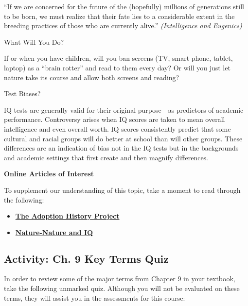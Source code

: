 \documentclass[
]{book}
\begin{document}
``If we are concerned for the future of the (hopefully) millions of generations still to be born, we must realize that their fate lies to a considerable extent in the breeding practices of those who are currently alive.'' \emph{(Intelligence and Eugenics)}

{What Will You Do?}

If or when you have children, will you ban screens (TV, smart phone, tablet, laptop) as a ``brain rotter'' and read to them every day? Or will you just let nature take its course and allow both screens and reading?

{Test Biases?}

IQ tests are generally valid for their original purpose---as predictors of academic performance. Controversy arises when IQ scores are taken to mean overall intelligence and even overall worth. IQ scores consistently predict that some cultural and racial groups will do better at school than will other groups. These differences are an indication of bias not in the IQ tests but in the backgrounds and academic settings that first create and then magnify differences.

\begin{caution}
\textbf{Online Articles of Interest}

To supplement our understanding of this topic, take a moment to read through the following:

\begin{itemize}
\item
  \href{https://darkwing.uoregon.edu/~adoption/topics/naturenurturestudies.htm}{\textbf{The Adoption History Project}}
\item
  \href{http://unisci.com/stories/20012/0417014.htm}{\textbf{Nature-Nature and IQ}}
\end{itemize}
\end{caution}

\hypertarget{activity-ch.-9-key-terms-quiz}{%
\subsection*{Activity: Ch. 9 Key Terms Quiz}\label{activity-ch.-9-key-terms-quiz}}

\begin{reflect}
In order to review some of the major terms from Chapter 9 in your textbook, take the following unmarked quiz. Although you will not be evaluated on these terms, they will assist you in the assessments for this course:
\end{reflect}
\end{document}
